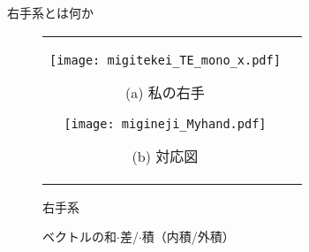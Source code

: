 \begin{memo}{右手系とは何か}
                    \begin{figure}[hbt]
                        \begin{tabular}{cc}
                            \begin{minipage}{0.5\hsize}
                                \begin{center}
                                    \texttt{[image: migitekei\_TE\_mono\_x.pdf]}

                                    (a) 私の右手
                                    \label{fig:migitekei_TE_mono_x}
                                \end{center}
                            \end{minipage}
                            \begin{minipage}{0.5\hsize}
                                \begin{center}
                                    \texttt{[image: migineji\_Myhand.pdf]}

                                    (b) 対応図
                                    \label{fig:migineji_Myhand}
                                \end{center}
                            \end{minipage}
                        \end{tabular}
                        \caption{右手系}
                    \end{figure}

                    \begin{figure}[hbt]
                        \begin{center}
                            \caption{ベクトルの和$\cdot$差/$\cdot$積（内積/外積）}
                            \label{fig:VecKagenjoujo}
                        \end{center}
                    \end{figure}
                \end{memo}

